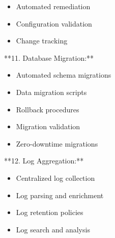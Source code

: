 \documentclass[11pt,a4paper]{article}
\begin{document}
\begin{itemize}
\item Automated remediation
\end{itemize}

\begin{itemize}
\item Configuration validation
\end{itemize}

\begin{itemize}
\item Change tracking
\end{itemize}

**11. Database Migration:**

\begin{itemize}
\item Automated schema migrations
\end{itemize}

\begin{itemize}
\item Data migration scripts
\end{itemize}

\begin{itemize}
\item Rollback procedures
\end{itemize}

\begin{itemize}
\item Migration validation
\end{itemize}

\begin{itemize}
\item Zero-downtime migrations
\end{itemize}

**12. Log Aggregation:**

\begin{itemize}
\item Centralized log collection
\end{itemize}

\begin{itemize}
\item Log parsing and enrichment
\end{itemize}

\begin{itemize}
\item Log retention policies
\end{itemize}

\begin{itemize}
\item Log search and analysis
\end{itemize}
\end{document}
